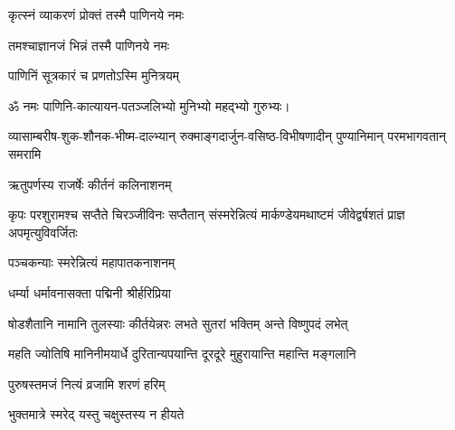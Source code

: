 \begin{center}

{कृत्स्नं व्याकरणं प्रोक्तं तस्मै पाणिनये नमः}

{तमश्चाज्ञानजं भिन्नं तस्मै पाणिनये नमः}

{पाणिनिं सूत्रकारं च प्रणतोऽस्मि मुनित्रयम्}

ॐ नमः पाणिनि-कात्यायन-पतञ्जलिभ्यो मुनिभ्यो महद्भ्यो गुरुभ्यः।




{व्यासाम्बरीष-शुक-शौनक-भीष्म-दाल्भ्यान्}
{रुक्माङ्गदार्जुन-वसिष्ठ-विभीषणादीन्}
{पुण्यानिमान् परमभागवतान् समरामि}


{ऋतुपर्णस्य राजर्षेः कीर्तनं कलिनाशनम्}

{कृपः परशुरामश्च सप्तैते चिरञ्जीविनः}
{सप्तैतान् संस्मरेन्नित्यं मार्कण्डेयमथाष्टमं}
{जीवेद्वर्षशतं प्राज्ञ अपमृत्युविवर्जितः}

{पञ्चकन्याः स्मरेन्नित्यं महापातकनाशनम्}




{धर्म्या धर्मावनासक्ता पद्मिनी श्रीर्हरिप्रिया}

{षोडशैतानि नामानि तुलस्याः कीर्तयेन्नरः}
{लभते सुतरां भक्तिम् अन्ते विष्णुपदं लभेत्}

{महति ज्योतिषि मानिनीमयार्धे}
{दुरितान्यपयान्ति दूरदूरे}
{मुहुरायान्ति महान्ति मङ्गलानि}


{पुरुषस्तमजं नित्यं व्रजामि शरणं हरिम्}


{भुक्तमात्रे स्मरेद् यस्तु चक्षुस्तस्य न हीयते}


\end{center}
